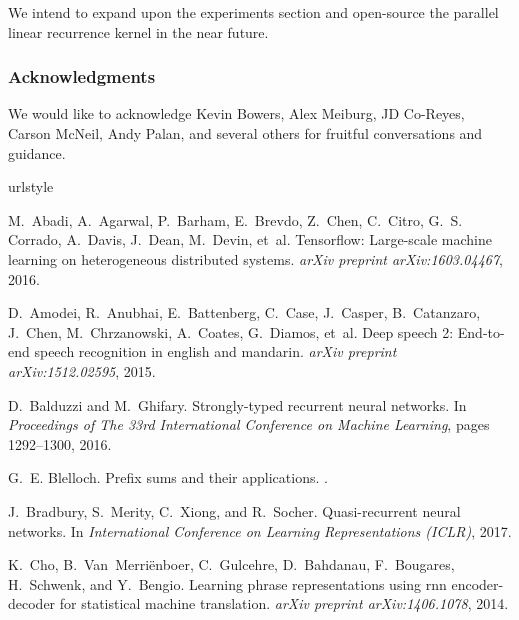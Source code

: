 \documentclass{article}
\begin{document}
We intend to expand upon the experiments section and open-source the parallel linear recurrence kernel in the near future.

\subsubsection*{Acknowledgments}
We would like to acknowledge Kevin Bowers, Alex Meiburg, JD Co-Reyes, Carson
McNeil, Andy Palan, and several others for fruitful conversations and guidance.

\begin{thebibliography}{19}
\providecommand{\natexlab}[1]{#1}
\providecommand{\url}[1]{\texttt{#1}}
\expandafter\ifx\csname urlstyle\endcsname\relax
  \providecommand{\doi}[1]{doi: #1}\else
  \providecommand{\doi}{doi: \begingroup \urlstyle{rm}\Url}\fi

M.~Abadi, A.~Agarwal, P.~Barham, E.~Brevdo, Z.~Chen, C.~Citro, G.~S. Corrado,
  A.~Davis, J.~Dean, M.~Devin, et~al.
\newblock Tensorflow: Large-scale machine learning on heterogeneous distributed
  systems.
\newblock \emph{arXiv preprint arXiv:1603.04467}, 2016.

D.~Amodei, R.~Anubhai, E.~Battenberg, C.~Case, J.~Casper, B.~Catanzaro,
  J.~Chen, M.~Chrzanowski, A.~Coates, G.~Diamos, et~al.
\newblock Deep speech 2: End-to-end speech recognition in english and mandarin.
\newblock \emph{arXiv preprint arXiv:1512.02595}, 2015.

D.~Balduzzi and M.~Ghifary.
\newblock Strongly-typed recurrent neural networks.
\newblock In \emph{Proceedings of The 33rd International Conference on Machine
  Learning}, pages 1292--1300, 2016.

G.~E. Blelloch.
\newblock Prefix sums and their applications.
.

J.~Bradbury, S.~Merity, C.~Xiong, and R.~Socher.
\newblock Quasi-recurrent neural networks.
\newblock In \emph{International Conference on Learning Representations
  (ICLR)}, 2017.

K.~Cho, B.~Van~Merri{\"e}nboer, C.~Gulcehre, D.~Bahdanau, F.~Bougares,
  H.~Schwenk, and Y.~Bengio.
\newblock Learning phrase representations using rnn encoder-decoder for
  statistical machine translation.
\newblock \emph{arXiv preprint arXiv:1406.1078}, 2014.


\end{thebibliography}
\end{document}
